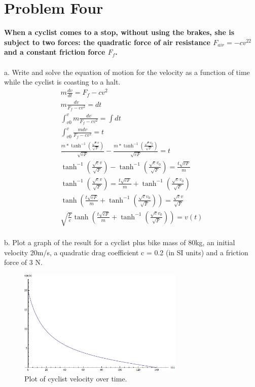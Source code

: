 \documentclass[10pt]{article} %
\begin{document}
\vspace{1 cm}       

\section{Problem Four}
\textbf{When a cyclist comes to a stop, without using the brakes, she is subject to two forces: the quadratic force of air resistance  $F_{air} = −cv^22$ and a constant friction force  $F_f$.} \\ \\

a. Write and solve the equation of motion for the velocity as a function of time while the cyclist is coasting to a halt.\\

\begin{align}
  m\frac{dv}{dt} = F_f - cv^2\\
  m\frac{dv}{F_f - cv^2} = dt\\
  \int_{v0}^v m\frac{dv}{F_f - cv^2} = \int dt\\
  \int_{v0}^v \frac{mdv}{F_f - cv^2} = t\\
  \frac{m*\tanh^{-1}(\frac{\sqrt{c}v}{\sqrt{F}})}{\sqrt{cF}} - \frac{m*\tanh^{-1}(\frac{\sqrt{c}v_0}{\sqrt{F}})}{\sqrt{cF}} = t\\
  \tanh^{-1}(\frac{\sqrt{c}v}{\sqrt{F}}) - \tanh^{-1}(\frac{\sqrt{c}v_0}{\sqrt{F}}) = \frac{t\sqrt{cF}}{m}\\
  \tanh^{-1}(\frac{\sqrt{c}v}{\sqrt{F}}) = \frac{t\sqrt{cF}}{m} + \tanh^{-1}(\frac{\sqrt{c}v_0}{\sqrt{F}})\\  
  \tanh(\frac{t\sqrt{cF}}{m} + \tanh^{-1}(\frac{\sqrt{c}v_0}{\sqrt{F}})) = \frac{\sqrt{c}v}{\sqrt{F}}\\
  \sqrt{\frac{F}{c}}\tanh(\frac{t\sqrt{cF}}{m} + \tanh^{-1}(\frac{\sqrt{c}v_0}{\sqrt{F}})) = v(t)\\    
\end{align}

b. Plot  a  graph  of  the  result  for  a  cyclist  plus  bike  mass  of  80kg,  an  initial  velocity 20m/s, a quadratic drag coefficient  c = 0.2 (in SI units) and a  friction  force of 3 N.\\

\begin{figure}[h!]
  \caption{Plot of cyclist velocity over time.}
  \centering
    \includegraphics[width=0.7\textwidth]{images/cyclist_velocity_m1.png}
\end{figure}
\end{document}
